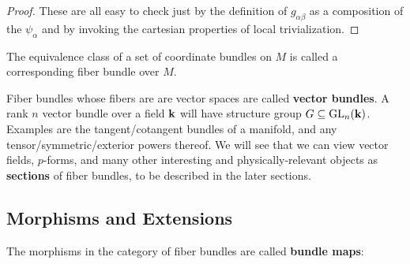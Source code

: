 		\begin{proof}
			These are all easy to check just by the definition of $g_{\alpha \beta}$ as a composition of the $\psi_\alpha$ and by invoking the cartesian properties of local trivialization.
		\end{proof}
		The equivalence class of a set of coordinate bundles on $M$ is called a corresponding fiber bundle over $M$.
		
		Fiber bundles whose fibers are are vector spaces are called \textbf{vector bundles}. A rank $n$ vector bundle over a field $\mathbf{k}$ will have structure group $G \subseteq \mathrm{GL}_n(\mathbf{k})$. Examples are the tangent/cotangent bundles of a manifold, and any tensor/symmetric/exterior powers thereof. We will see that we can view vector fields, $p$-forms, and many other interesting and physically-relevant objects as \textbf{sections} of fiber bundles, to be described in the later sections.
		
		\subsection{Morphisms and Extensions}
		The morphisms in the category of fiber bundles are called \textbf{bundle maps}:
		
